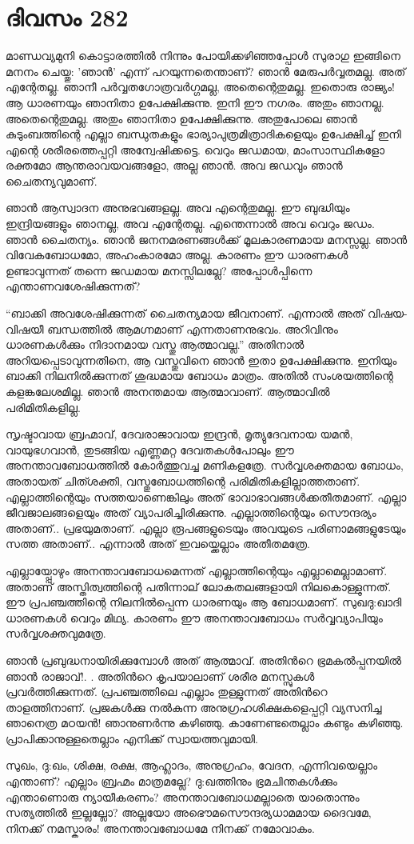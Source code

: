 \section{ദിവസം 282}


മാണ്ഡവ്യമുനി കൊട്ടാരത്തില്‍ നിന്നും പോയിക്കഴിഞ്ഞപ്പോള്‍ സുരാഗു ഇങ്ങിനെ മനനം ചെയ്തു: ’ഞാന്‍’ എന്ന് പറയുന്നതെന്താണ്? ഞാന്‍ മേരുപര്‍വ്വതമല്ല. അത് എന്റേതല്ല. ഞാനീ പര്‍വ്വതഗോത്രവര്‍ഗ്ഗമല്ല, അതെന്റെതുമല്ല. ഇതൊരു രാജ്യം! ആ ധാരണയും ഞാനിതാ ഉപേക്ഷിക്കുന്നു. ഇനി ഈ നഗരം. അതും ഞാനല്ല. അതെന്റെതുമല്ല. അതും ഞാനിതാ ഉപേക്ഷിക്കുന്നു. അതുപോലെ ഞാന്‍ കുടുംബത്തിന്റെ എല്ലാ ബന്ധുതകളും ഭാര്യാപുത്രമിത്രാദികളെയും ഉപേക്ഷിച്ച് ഇനി എന്റെ ശരീരത്തെപ്പറ്റി അന്വേഷിക്കട്ടെ. വെറും ജഡമായ, മാംസാസ്ഥികളോ രക്തമോ ആന്തരാവയവങ്ങളോ, അല്ല ഞാന്‍.  അവ ജഡവും ഞാന്‍ ചൈതന്യവുമാണ്.      

ഞാന്‍ ആസ്വാദന അനുഭവങ്ങളല്ല. അവ എന്റെതുമല്ല. ഈ ബുദ്ധിയും ഇന്ദ്രിയങ്ങളും ഞാനല്ല, അവ എന്റേതല്ല. എന്തെന്നാല്‍ അവ വെറും ജഡം. ഞാന്‍ ചൈതന്യം. ഞാന്‍ ജനനമരണങ്ങള്‍ക്ക് മൂലകാരണമായ മനസ്സല്ല. ഞാന്‍ വിവേകബോധമോ, അഹംകാരമോ അല്ല. കാരണം ഈ ധാരണകള്‍ ഉണ്ടാവുന്നത് തന്നെ ജഡമായ മനസ്സിലല്ലേ? അപ്പോള്‍പ്പിന്നെ എന്താണവശേഷിക്കുന്നത്? 

“ബാക്കി അവശേഷിക്കുന്നത് ചൈതന്യമായ ജീവനാണ്. എന്നാല്‍ അത് വിഷയ-വിഷയീ ബന്ധത്തില്‍ ആമഗ്നമാണ് എന്നതാണനുഭവം. അറിവിനും ധാരണകള്‍ക്കും നിദാനമായ വസ്തു ആത്മാവല്ല.” അതിനാല്‍ അറിയപ്പെടാവുന്നതിനെ, ആ വസ്തുവിനെ  ഞാന്‍ ഇതാ ഉപേക്ഷിക്കുന്നു. ഇനിയും ബാക്കി നിലനില്‍ക്കുന്നത് ശുദ്ധമായ ബോധം മാത്രം. അതില്‍ സംശയത്തിന്റെ കളങ്കലേശമില്ല. ഞാന്‍ അനന്തമായ ആത്മാവാണ്. ആത്മാവില്‍ പരിമിതികളില്ല.

സൃഷ്ടാവായ ബ്രഹ്മാവ്, ദേവരാജാവായ ഇന്ദ്രന്‍, മൃത്യുദേവനായ യമന്‍, വായുഭഗവാന്‍, തുടങ്ങിയ എണ്ണമറ്റ ദേവതകള്‍പോലും ഈ അനന്താവബോധത്തില്‍ കോര്‍ത്തുവച്ച മണികളത്രേ. സര്‍വ്വശക്തമായ ബോധം, അതായത് ചിത്ശക്തി, വസ്തുബോധത്തിന്റെ പരിമിതികളില്ലാത്തതാണ്. എല്ലാത്തിന്റെയും സത്തയാണെങ്കിലും അത് ഭാവാഭാവങ്ങള്‍ക്കതീതമാണ്. എല്ലാ ജീവജാലങ്ങളെയും അത് വ്യാപരിച്ചിരിക്കുന്നു. എല്ലാത്തിന്റെയും സൌന്ദര്യം അതാണ്‌.. പ്രഭയുമതാണ്. എല്ലാ രൂപങ്ങളുടെയും അവയുടെ പരിണാമങ്ങളുടേയും സത്ത അതാണ്‌.. എന്നാല്‍ അത് ഇവയ്ക്കെല്ലാം അതീതമത്രേ. 
    
എല്ലായ്പ്പോഴും അനന്താവബോധമെന്നത് എല്ലാത്തിന്റെയും എല്ലാമെല്ലാമാണ്. അതാണ്‌ അസ്തിത്വത്തിന്റെ പതിന്നാല് ലോകതലങ്ങളായി നിലകൊള്ളുന്നത്. ഈ പ്രപഞ്ചത്തിന്റെ നിലനില്‍പ്പെന്ന ധാരണയും ആ ബോധമാണ്. സുഖദു:ഖാദി ധാരണകള്‍ വെറും മിഥ്യ. കാരണം ഈ അനന്താവബോധം സര്‍വ്വവ്യാപിയും സര്‍വ്വശക്തവുമത്രേ.
 
ഞാന്‍ പ്രബുദ്ധനായിരിക്കുമ്പോള്‍ അത് ആത്മാവ്. അതിന്‍റെ ഭ്രമകല്‍പ്പനയില്‍ ഞാന്‍ രാജാവ്‌!. . അതിന്‍റെ കൃപയാലാണ് ശരീര മനസ്സുകള്‍ പ്രവര്‍ത്തിക്കുന്നത്. പ്രപഞ്ചത്തിലെ എല്ലാം തുള്ളുന്നത് അതിന്‍റെ താളത്തിനാണ്. പ്രജകള്‍ക്കു നല്‍കുന്ന അനുഗ്രഹശിക്ഷകളെപ്പറ്റി വ്യസനിച്ച ഞാനെത്ര മഠയന്‍! ഞാനുണര്‍ന്നു കഴിഞ്ഞു. കാണേണ്ടതെല്ലാം കണ്ടും കഴിഞ്ഞു. പ്രാപിക്കാനുള്ളതെല്ലാം എനിക്ക് സ്വായത്തവുമായി.  
  
സുഖം, ദു:ഖം, ശിക്ഷ, രക്ഷ, ആഹ്ലാദം, അനുഗ്രഹം, വേദന, എന്നിവയെല്ലാം എന്താണ്? എല്ലാം ബ്രഹ്മം മാത്രമല്ലേ? ദു:ഖത്തിനും ഭ്രമചിന്തകള്‍ക്കും എന്താണൊരു ന്യായീകരണം? അനന്താവബോധമല്ലാതെ യാതൊന്നും സത്യത്തില്‍ ഇല്ലല്ലോ? അല്ലയോ അഭൌമസൌന്ദര്യധാമമായ ദൈവമേ, നിനക്ക് നമസ്കാരം! അനന്താവബോധമേ നിനക്ക് നമോവാകം.